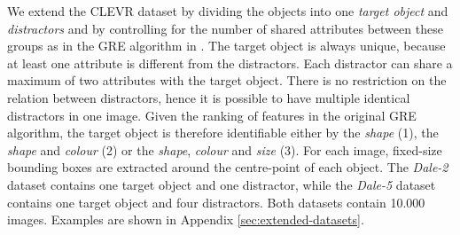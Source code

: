 \documentclass[11pt]{article}
\begin{document}
We extend the CLEVR dataset \citep{Johnson2016} by dividing the objects into one \emph{target object} and \emph{distractors}
and by controlling for the number of shared attributes between these groups as %
in the GRE algorithm in \citep{Dale1995}.
The target object is always unique, because at least one attribute is different from the distractors.
Each distractor can share a maximum of two attributes with the target object.
There is no restriction on the relation between distractors, hence it is possible to have multiple identical distractors in one image.
Given the ranking of features in the original GRE algorithm, the target object is therefore identifiable either by the \emph{shape} (1), the \emph{shape} and \emph{colour} (2) or the \emph{shape}, \emph{colour} and \emph{size} (3).
For each image, fixed-size bounding boxes are extracted around the centre-point of each object.
%
The \emph{Dale-2} dataset contains one target object and one distractor, while the \emph{Dale-5} dataset contains one target object and four distractors.
Both datasets contain 10.000 images.
Examples are shown in
Appendix \ref{sec:extended-datasets}. %

\end{document}
